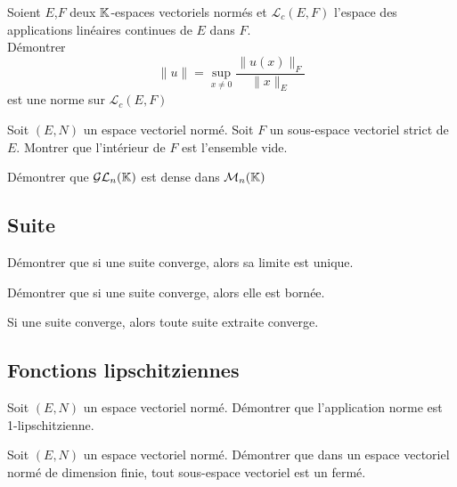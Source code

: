 \documentclass{book}
\begin{document}
\begin{Exercice}
Soient $E$,$F$ deux $\mathbb{K}$-espaces vectoriels normés et $\mathcal{L}_c(E,F)$ l'espace des applications linéaires continues de $E$ dans $F$.\\
Démontrer  $$ \|u\|=\sup_{x\neq 0}\frac{ \| u(x)\|_F }{\|x\|_E}$$ est une norme sur $\mathcal{L}_c (E,F)$
\end{Exercice}


\begin{Exercice}[Intérieur]
Soit $(E, N)$ un espace vectoriel normé. Soit $F$ un sous-espace vectoriel strict de $E$. Montrer que l'intérieur de $F$ est l'ensemble vide.
\end{Exercice}

\begin{Exercice}[Intérieur]
Démontrer que $\mathcal{GL}_n(\mathbb{K})$ est dense dans $\mathcal{M}_{n}(\mathbb{K})$
\end{Exercice}


\subsection{Suite}
\begin{Exercice}
Démontrer que si une suite converge, alors sa limite est unique.
\end{Exercice}

\begin{Exercice}[Bornée]
Démontrer que si une suite converge, alors elle est bornée.
\end{Exercice}
\begin{Exercice}
Si une suite converge, alors toute suite extraite converge.
\end{Exercice}


\subsection{Fonctions lipschitziennes}
\begin{Exercice}
Soit $(E, N)$ un espace vectoriel normé.
Démontrer que l'application norme est 1-lipschitzienne.
\end{Exercice}
\begin{Exercice}
Soit $(E, N)$ un espace vectoriel normé.
Démontrer que dans un espace vectoriel normé de dimension finie, tout sous-espace vectoriel est un fermé.
\end{Exercice}
\end{document}
